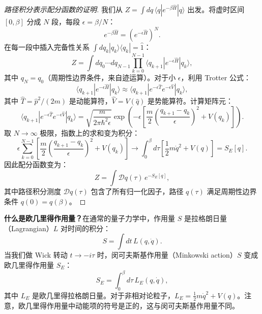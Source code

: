 \begin{proof}[路径积分表示配分函数的证明]
我们从 $Z = \int dq \, \langle q | e^{-\beta\hat{H}} | q \rangle$ 出发。将虚时区间 $[0, \beta]$ 分成 $N$ 段，每段 $\epsilon = \beta/N$：
\begin{equation}
    e^{-\beta\hat{H}} = \left(e^{-\epsilon\hat{H}}\right)^N.
\end{equation}
在每一段中插入完备性关系 $\int dq_k |q_k\rangle\langle q_k| = \hat{1}$：
\begin{equation}
    Z = \int dq_0 \cdots dq_{N-1} \prod_{k=0}^{N-1} \langle q_{k+1} | e^{-\epsilon\hat{H}} | q_k \rangle,
\end{equation}
其中 $q_N = q_0$（周期性边界条件，来自迹运算）。对于小 $\epsilon$，利用 Trotter 公式：
\begin{equation}
    \langle q_{k+1} | e^{-\epsilon\hat{H}} | q_k \rangle \approx \langle q_{k+1} | e^{-\epsilon\hat{T}} e^{-\epsilon\hat{V}} | q_k \rangle,
\end{equation}
其中 $\hat{T} = \hat{p}^2/(2m)$ 是动能算符，$\hat{V} = V(\hat{q})$ 是势能算符。计算矩阵元：
\begin{equation}
    \langle q_{k+1} | e^{-\epsilon\hat{T}} e^{-\epsilon\hat{V}} | q_k \rangle = \sqrt{\frac{m}{2\pi\hbar^2\epsilon}} \exp\left(-\epsilon\left[\frac{m}{2}\left(\frac{q_{k+1}-q_k}{\epsilon}\right)^2 + V(q_k)\right]\right).
\end{equation}
取 $N \to \infty$ 极限，指数上的求和变为积分：
\begin{equation}
    \epsilon \sum_{k=0}^{N-1} \left[\frac{m}{2}\left(\frac{q_{k+1}-q_k}{\epsilon}\right)^2 + V(q_k)\right] \to \int_0^{\beta} d\tau \left[\frac{1}{2}m\dot{q}^2 + V(q)\right] = S_E[q].
\end{equation}
因此配分函数变为：
\begin{equation}
    Z = \int \mathcal{D}q(\tau) \, e^{-S_E[q]},
\end{equation}
其中路径积分测度 $\mathcal{D}q(\tau)$ 包含了所有归一化因子，路径 $q(\tau)$ 满足周期性边界条件 $q(0) = q(\beta)$。
\end{proof}

\begin{definition}[欧几里得作用量]
\textbf{什么是欧几里得作用量？}在通常的量子力学中，作用量 $S$ 是拉格朗日量（Lagrangian）$L$ 对时间的积分：
\begin{equation}
    S = \int dt \, L(q, \dot{q}).
\end{equation}
当我们做 Wick 转动 $t \to -i\tau$ 时，闵可夫斯基作用量（Minkowski action）$S$ 变成欧几里得作用量 $S_E$：
\begin{equation}
    S_E = \int_0^{\beta} d\tau \, L_E(q, \dot{q}),
\end{equation}
其中 $L_E$ 是欧几里得拉格朗日量。对于非相对论粒子，$L_E = \frac{1}{2}m\dot{q}^2 + V(q)$。注意，欧几里得作用量中动能项的符号是正的，这与闵可夫斯基作用量不同。
\end{definition}

